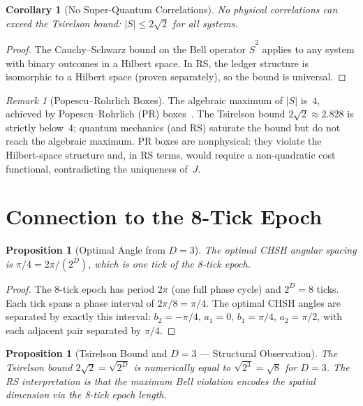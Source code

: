 \documentclass[12pt,a4paper]{article}
\newtheorem{corollary}[theorem]{Corollary}
\newtheorem{proposition}[theorem]{Proposition}
\theoremstyle{definition}
\theoremstyle{remark}
\newtheorem{remark}[theorem]{Remark}
\begin{document}
\begin{corollary}[No Super-Quantum Correlations]
No physical correlations can exceed the Tsirelson bound:
$|S| \leq 2\sqrt{2}$ for all systems.
\end{corollary}

\begin{proof}
The Cauchy--Schwarz bound on the Bell operator $\hat{S}^2$
applies to any system with binary outcomes in a Hilbert space.
In RS, the ledger structure is isomorphic to a Hilbert space
(proven separately), so the bound is universal.
\end{proof}

\begin{remark}[Popescu--Rohrlich Boxes]
The algebraic maximum of $|S|$ is~$4$, achieved by
Popescu--Rohrlich (PR) boxes~\cite{PopescuRohrlich1994}.
The Tsirelson bound $2\sqrt{2} \approx 2.828$ is strictly
below~$4$; quantum mechanics (and RS) saturate the bound but do
not reach the algebraic maximum.  PR boxes are nonphysical:
they violate the Hilbert-space structure and, in RS terms,
would require a non-quadratic cost functional, contradicting
the uniqueness of~$J$.
\end{remark}

\section{Connection to the 8-Tick Epoch}
\label{sec:epoch}

\begin{proposition}[Optimal Angle from $D = 3$]
\label{prop:angle}
The optimal CHSH angular spacing is $\pi/4 = 2\pi/(2^D)$,
which is one tick of the 8-tick epoch.
\end{proposition}

\begin{proof}
The 8-tick epoch has period $2\pi$ (one full phase cycle) and
$2^D = 8$ ticks.  Each tick spans a phase interval of
$2\pi/8 = \pi/4$.  The optimal CHSH angles are separated by
exactly this interval:
$b_2 = -\pi/4$, $a_1 = 0$, $b_1 = \pi/4$, $a_2 = \pi/2$,
with each adjacent pair separated by $\pi/4$.
\end{proof}

\begin{proposition}[Tsirelson Bound and $D = 3$ --- Structural Observation]
\label{prop:tsirelson-d}
The Tsirelson bound $2\sqrt{2} = \sqrt{2^D}$ is numerically equal to
$\sqrt{2^3} = \sqrt{8}$ for $D = 3$.  The RS interpretation is that
the maximum Bell violation encodes the spatial dimension via the
8-tick epoch length.
\end{proposition}
\end{document}
